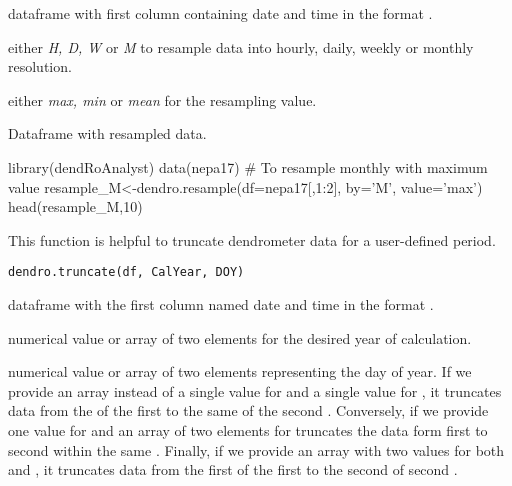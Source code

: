 \documentclass[a4paper]{book}
\begin{document}
%
\begin{Arguments}
\begin{ldescription}
\item[\code{df}] dataframe with first column containing date and time in the format .

\item[\code{by}] either \emph{H, D, W} or \emph{M} to resample data into hourly, daily, weekly or monthly resolution.

\item[\code{value}] either \emph{max, min} or \emph{mean} for the resampling value.
\end{ldescription}
\end{Arguments}
%
\begin{Value}
Dataframe with resampled data.
\end{Value}
%
\begin{Examples}
\begin{ExampleCode}
library(dendRoAnalyst)
data(nepa17)
# To resample monthly with maximum value
resample_M<-dendro.resample(df=nepa17[,1:2], by='M', value='max')
head(resample_M,10)

\end{ExampleCode}
\end{Examples}
%
\begin{Description}\relax
This function is helpful to truncate dendrometer data for a user-defined period.
\end{Description}
%
\begin{Usage}
\begin{verbatim}
dendro.truncate(df, CalYear, DOY)
\end{verbatim}
\end{Usage}
%
\begin{Arguments}
\begin{ldescription}
\item[\code{df}] dataframe with the first column named date and time in the format .

\item[\code{CalYear}] numerical value or array of two elements for the desired year of calculation.

\item[\code{DOY}] numerical value or array of two elements representing the day of year. If we provide an array instead of a single value for  and a single value for , it truncates data from the  of the first  to the same  of the second .  Conversely, if we provide one value for  and an array of two elements for  truncates the data form first  to second  within the same . Finally, if we provide an array with two values for both  and , it truncates data from the first  of the first  to the second  of second .
\end{ldescription}
\end{Arguments}
\end{document}
